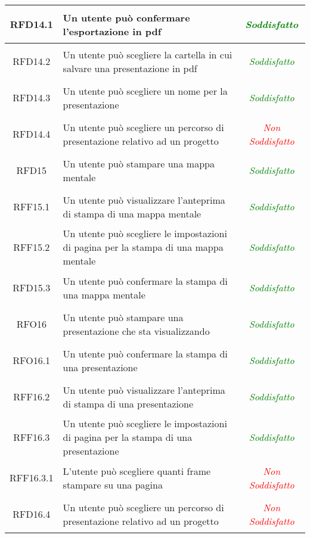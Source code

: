 \begin{longtable}{|c|>{\centering}m{7cm}|c|}
\hypertarget{RFD14.1}{RFD14.1} & Un utente può confermare l'esportazione in pdf & \textcolor{Green}{\textit{Soddisfatto}}\\ \hline
\hypertarget{RFD14.2}{RFD14.2} & Un utente può scegliere la cartella in cui salvare una presentazione in pdf & \textcolor{Green}{\textit{Soddisfatto}}\\ \hline
\hypertarget{RFD14.3}{RFD14.3} & Un utente può scegliere un nome per la presentazione & \textcolor{Green}{\textit{Soddisfatto}}\\ \hline
\hypertarget{RFD14.4}{RFD14.4} & Un utente può scegliere un percorso di presentazione relativo ad un progetto & \textcolor{Red}{\textit{Non Soddisfatto}}\\ \hline
\hypertarget{RFD15}{RFD15} & Un utente può stampare una mappa mentale & \textcolor{Green}{\textit{Soddisfatto}}\\ \hline
\hypertarget{RFF15.1}{RFF15.1} & Un utente può visualizzare l'anteprima di stampa di una mappa mentale & \textcolor{Green}{\textit{Soddisfatto}}\\ \hline
\hypertarget{RFF15.2}{RFF15.2} & Un utente può scegliere le impostazioni di pagina per la stampa di una mappa mentale & \textcolor{Green}{\textit{Soddisfatto}}\\ \hline
\hypertarget{RFD15.3}{RFD15.3} & Un utente può confermare la stampa di una mappa mentale & \textcolor{Green}{\textit{Soddisfatto}}\\ \hline
\hypertarget{RFO16}{RFO16} & Un utente può stampare una presentazione che sta visualizzando & \textcolor{Green}{\textit{Soddisfatto}}\\ \hline
\hypertarget{RFO16.1}{RFO16.1} & Un utente può confermare la stampa di una presentazione & \textcolor{Green}{\textit{Soddisfatto}}\\ \hline
\hypertarget{RFF16.2}{RFF16.2} & Un utente può visualizzare l'anteprima di stampa di una presentazione & \textcolor{Green}{\textit{Soddisfatto}}\\ \hline
\hypertarget{RFF16.3}{RFF16.3} & Un utente può scegliere le impostazioni di pagina per la stampa di una presentazione & \textcolor{Green}{\textit{Soddisfatto}}\\ \hline
\hypertarget{RFF16.3.1}{RFF16.3.1} & L’utente può scegliere quanti frame stampare su una pagina & \textcolor{Red}{\textit{Non Soddisfatto}}\\ \hline
\hypertarget{RFD16.4}{RFD16.4} & Un utente può scegliere un percorso di presentazione relativo ad un progetto & \textcolor{Red}{\textit{Non Soddisfatto}}\\ \hline

\end{longtable}
